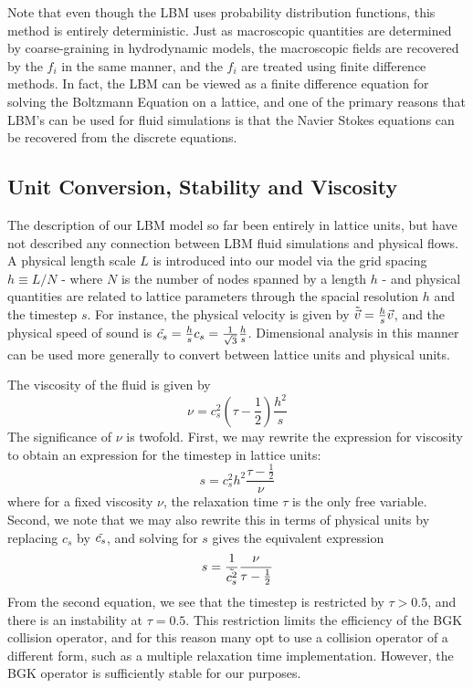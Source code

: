 \documentclass[a4paper]{article}
\begin{document}
Note that even though the LBM uses probability distribution functions, this method is entirely deterministic. Just as macroscopic quantities are determined by coarse-graining in hydrodynamic models, the macroscopic fields are recovered by the $f_i$ in the same manner, and the $f_i$ are treated using finite difference methods. In fact, the LBM can be viewed as a finite difference equation for solving the Boltzmann Equation on a lattice, and one of the primary reasons that LBM's can be used for fluid simulations is that the Navier Stokes equations can be recovered from the discrete equations. \cite{meskas, acoustics, buk}

\subsection{Unit Conversion, Stability and Viscosity}
The description of our LBM model so far been entirely in lattice units, but have not described any connection between LBM fluid simulations and physical flows. A physical length scale $L$ is introduced into our model via the grid spacing $h \equiv L/N$ - where $N$ is the number of nodes spanned by a length $h$ - and physical quantities are related to lattice parameters through the spacial resolution $h$ and the timestep $s$. For instance, the physical velocity is given by $\Tilde{\vec{v}} = \frac{h}{s}\vec{v}$, and the physical speed of sound is $\Tilde{c_s} = \frac{h}{s}c_s = \frac{1}{\sqrt{3}}\frac{h}{s}$. Dimensional analysis in this manner can be used more generally to convert between lattice units and physical units. \cite{acoustics} 

The viscosity of the fluid is given by 
\begin{equation}
    \nu = c_s^2(\tau-\frac{1}{2})\frac{h^2}{s}
\end{equation}
The significance of $\nu$ is twofold. First, we may rewrite the expression for viscosity to obtain an expression for the timestep in lattice units:
\begin{equation}
    s = c_s^2h^2\frac{\tau - \frac{1}{2}}{\nu}    
\end{equation}
where for a fixed viscosity $\nu$, the relaxation time $\tau$ is the only free variable. Second, we note that we may also rewrite this in terms of physical units by replacing $c_s$ by $\Tilde{c_s}$, and solving for $s$ gives the equivalent expression
\begin{equation}
    s = \frac{1}{\Tilde{c_s^2}}\frac{\nu}{\tau - \frac{1}{2}}    
\end{equation}
From the second equation, we see that the timestep is restricted by $\tau > 0.5$, and there is an instability at $\tau = 0.5$. \cite{meskas, acoustics} This restriction limits the efficiency of the BGK collision operator, and for this reason many opt to use a collision operator of a different form, such as a multiple relaxation time implementation. \cite{multirelaxtimes} However, the BGK operator is sufficiently stable for our purposes.
\end{document}
